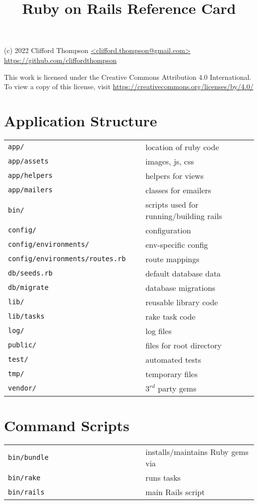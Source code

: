 \documentclass[6pt]{article}
\begin{document}
\raggedright
\footnotesize
\begin{multicols}{3}

  \title{Ruby on Rails Reference Card}

  {\scriptsize
    (c) 2022 Clifford Thompson \url{<clifford.thompson@gmail.com>}\\
    \url{https://github.com/cliffordthompson}

    This work is licensed under the Creative Commons Attribution 4.0 International.
    To view a copy of this license, visit
    \url{https://creativecommons.org/licenses/by/4.0/}
  }

  \section{Application Structure}
  \begin{tabular}{L{0.55\linewidth} L{0.45\linewidth}}
    \tt app/ & location of ruby code \\
    \tt app/assets &  images, js, css \\
    \tt app/helpers &  helpers for views \\
    \tt app/mailers &  classes for emailers \\
    \tt bin/ & scripts used for running/building rails \\
    \tt config/ & configuration \\
    \tt config/environments/ & env-specific config \\
    \tt config/environments/routes.rb & route mappings \\
    \tt db/seeds.rb & default database data\\
    \tt db/migrate & database migrations\\
    \tt lib/ & reusable library code\\
    \tt lib/tasks & rake task code\\
    \tt log/ & log files\\
    \tt public/ & files for root directory \\
    \tt test/ & automated tests \\
    \tt tmp/ & temporary files\\
    \tt vendor/ & $3^{rd}$ party gems\\
  \end{tabular}

  \section{Command Scripts}
  \begin{tabular}{L{0.55\linewidth} L{0.45\linewidth}}
    \tt bin/bundle & installs/maintains Ruby gems via \\
    \tt bin/rake & runs tasks\\
    \tt bin/rails & main Rails script\\
  \end{tabular}

\end{multicols}
\end{document}

